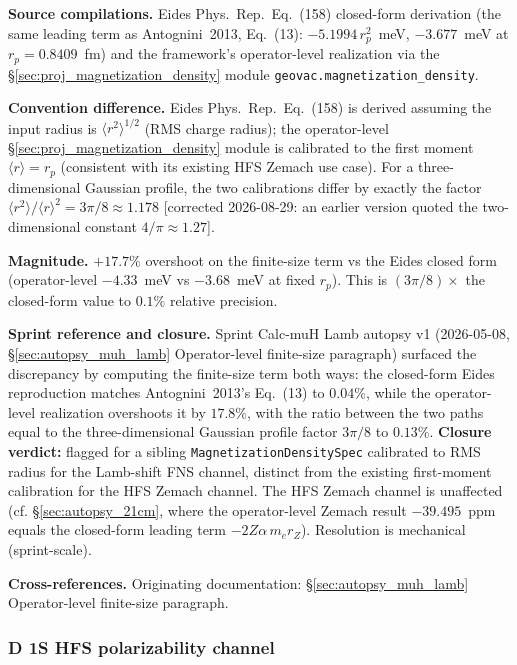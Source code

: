 \documentclass[11pt]{article}
\begin{document}
\textbf{Source compilations.}  Eides Phys.\ Rep.\ Eq.~(158) closed-form derivation
(the same leading term as Antognini~2013, Eq.~(13): $-5.1994\,r_p^2$~meV,
$-3.677$~meV at $r_p = 0.8409$~fm) and the framework's operator-level realization via the
\S\ref{sec:proj_magnetization_density} module
\texttt{geovac.magnetization\_density}.

\textbf{Convention difference.}  Eides Phys.\ Rep.\ Eq.~(158) is derived assuming
the input radius is $\langle r^2\rangle^{1/2}$ (RMS charge radius);
the operator-level
\S\ref{sec:proj_magnetization_density} module is calibrated to the
first moment $\langle r\rangle = r_p$ (consistent with its
existing HFS Zemach use case).  For a three-dimensional Gaussian profile, the two
calibrations differ by exactly the factor
$\langle r^2\rangle / \langle r\rangle^2 = 3\pi/8 \approx 1.178$
[corrected 2026-08-29: an earlier version quoted the two-dimensional
constant $4/\pi \approx 1.27$].

\textbf{Magnitude.}  $+17.7\%$ overshoot on the finite-size term vs the
Eides closed form (operator-level $-4.33$~meV vs $-3.68$~meV at fixed
$r_p$).
This is $(3\pi/8)\times$ the closed-form value to $0.1\%$ relative
precision.

\textbf{Sprint reference and closure.}  Sprint Calc-muH Lamb autopsy v1
(2026-05-08, \S\ref{sec:autopsy_muh_lamb} Operator-level finite-size
paragraph) surfaced the discrepancy by computing the finite-size term
both ways: the closed-form Eides reproduction matches Antognini~2013's
Eq.~(13) to $0.04\%$, while the operator-level realization overshoots
it by $17.8\%$, with the ratio between the two paths equal to the
three-dimensional Gaussian profile factor $3\pi/8$ to $0.13\%$.
\textbf{Closure verdict:} flagged for a sibling
\texttt{MagnetizationDensitySpec} calibrated to RMS radius for the
Lamb-shift FNS channel, distinct from the existing first-moment
calibration for the HFS Zemach channel.  The HFS Zemach channel is
unaffected (cf. \S\ref{sec:autopsy_21cm}, where the operator-level
Zemach result $-39.495$~ppm equals the closed-form leading term
$-2Z\alpha\, m_e r_Z$).  Resolution is mechanical (sprint-scale).

\textbf{Cross-references.}  Originating documentation:
\S\ref{sec:autopsy_muh_lamb} Operator-level finite-size paragraph.

\subsubsection{D 1S HFS polarizability channel}
\label{sec:conv_d_polarizability}
\end{document}
